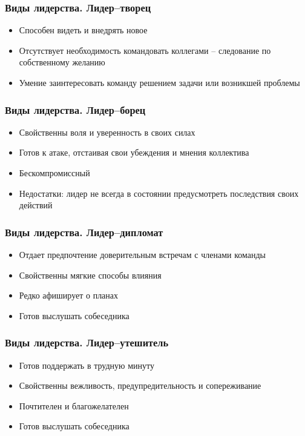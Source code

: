 \documentclass{../industrial-development}
\begin{document}
\begin{frame} \frametitle{Виды лидерства. Лидер--творец}
\begin{itemize}
  \item Способен видеть и внедрять новое
  \item Отсутствует необходимость командовать коллегами -- следование по собственному желанию
  \item Умение заинтересовать команду решением задачи или возникшей проблемы 
  \end{itemize}
\end{frame}

\begin{frame} \frametitle{Виды лидерства. Лидер--борец}
\begin{itemize}
  \item Свойственны воля и уверенность в своих силах
  \item Готов к атаке, отстаивая свои убеждения и мнения коллектива
  \item Бескомпромиссный 
  \item Недостатки: лидер не всегда в состоянии предусмотреть последствия своих действий
  \end{itemize}

\end{frame}

\begin{frame} \frametitle{Виды лидерства. Лидер--дипломат}
\begin{itemize}
  \item Отдает предпочтение доверительным встречам с членами команды
  \item Свойственны мягкие способы влияния
  \item Редко афиширует о планах 
  \item Готов выслушать собеседника
  \end{itemize}
\end{frame}

\begin{frame} \frametitle{Виды лидерства. Лидер--утешитель}
\begin{itemize}
  \item Готов поддержать в трудную минуту
  \item Свойственны вежливость, предупредительность и сопереживание
  \item Почтителен и благожелателен 
  \item Готов выслушать собеседника
  \end{itemize}

\end{frame}
\end{document}

